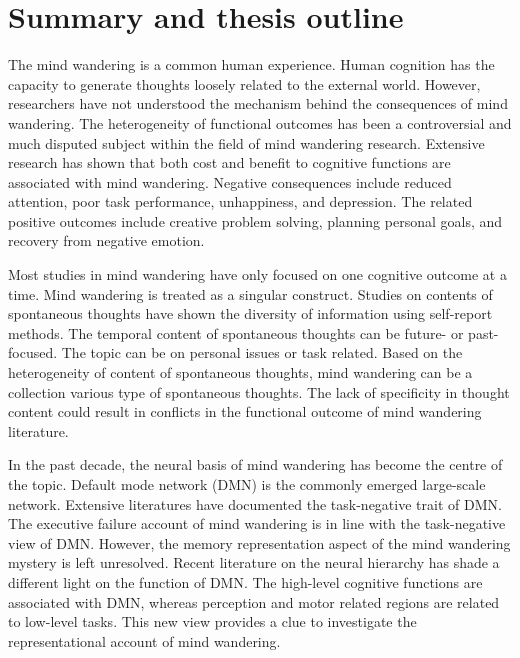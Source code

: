 \section{Summary and thesis outline}

The mind wandering is a common human experience. Human cognition has the capacity to generate thoughts loosely related to the external world. However, researchers have not understood the mechanism behind the consequences of mind wandering. The heterogeneity of functional outcomes has been a controversial and much disputed subject within the field of mind wandering research. Extensive research has shown that both cost and benefit to cognitive functions are associated with mind wandering. Negative consequences include reduced attention, poor task performance, unhappiness, and depression.  The related positive outcomes include creative problem solving, planning personal goals, and recovery from negative emotion. 

Most studies in mind wandering have only focused on one cognitive outcome at a time. Mind wandering is treated as a singular construct. Studies on contents of spontaneous thoughts have shown the diversity of information using self-report methods.  The temporal content of spontaneous thoughts can be future- or past-focused. The topic can be on personal issues or task related. Based on the heterogeneity of content of spontaneous thoughts, mind wandering can be a collection various type of spontaneous thoughts. The lack of specificity in thought content could result in conflicts in the functional outcome of mind wandering literature.

In the past decade, the neural basis of mind wandering has become the centre of the topic. Default mode network (DMN) is the commonly emerged large-scale network. Extensive literatures have documented the task-negative trait of DMN. The executive failure account of mind wandering is in line with the task-negative view of DMN. However, the memory representation aspect of the mind wandering mystery is left unresolved. Recent literature on the neural hierarchy has shade a different light on the function of DMN. The high-level cognitive functions are associated with DMN, whereas perception and motor related regions are related to low-level tasks. This new view provides a clue to investigate the representational account of mind wandering. 

